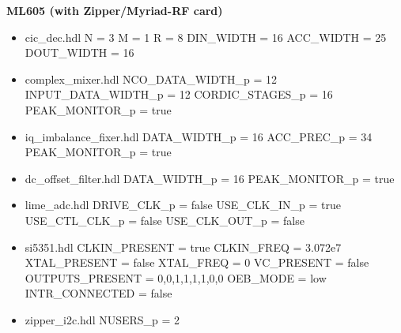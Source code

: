 \begin{minipage}[t]{.5\textwidth}
	\textbf{ML605 (with Zipper/Myriad-RF card)}
	\begin{itemize}
		\item cic\_dec.hdl
			\subitem N = 3
			\subitem M = 1
			\subitem R = 8
			\subitem DIN\_WIDTH = 16
			\subitem ACC\_WIDTH = 25
			\subitem DOUT\_WIDTH = 16
		\item complex\_mixer.hdl
			\subitem NCO\_DATA\_WIDTH\_p = 12
			\subitem INPUT\_DATA\_WIDTH\_p = 12
			\subitem CORDIC\_STAGES\_p = 16
			\subitem PEAK\_MONITOR\_p = true
		\item iq\_imbalance\_fixer.hdl
			\subitem DATA\_WIDTH\_p = 16
			\subitem ACC\_PREC\_p = 34
			\subitem PEAK\_MONITOR\_p = true
		\item dc\_offset\_filter.hdl
			\subitem DATA\_WIDTH\_p = 16
			\subitem PEAK\_MONITOR\_p = true
		\item lime\_adc.hdl
			\subitem DRIVE\_CLK\_p = false
			\subitem USE\_CLK\_IN\_p = true
			\subitem USE\_CTL\_CLK\_p = false
			\subitem USE\_CLK\_OUT\_p = false
		\item si5351.hdl
			\subitem CLKIN\_PRESENT = true
			\subitem CLKIN\_FREQ = 3.072e7
			\subitem XTAL\_PRESENT = false
			\subitem XTAL\_FREQ = 0
			\subitem VC\_PRESENT = false
			\subitem OUTPUTS\_PRESENT = 0,0,1,1,1,1,0,0
			\subitem OEB\_MODE = low
			\subitem INTR\_CONNECTED = false
		\item zipper\_i2c.hdl
			\subitem NUSERS\_p = 2
	\end{itemize}
\end{minipage}
